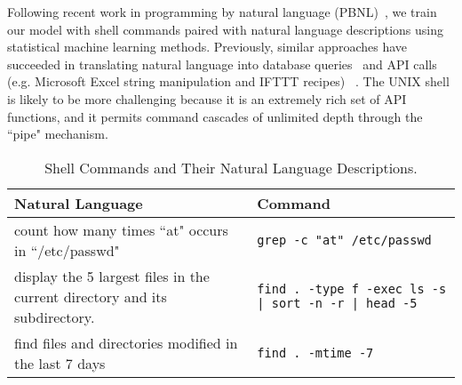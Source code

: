 Following recent work in programming by natural language (PBNL)~\cite{DBLP:conf/mobisys/LeGS13,DBLP:journals/corr/DesaiGHJKMRR15}, we train our model with shell commands paired with natural language descriptions using statistical machine learning methods. Previously, similar approaches have succeeded in translating natural language into database queries~\cite{DBLP:journals/pvldb/LiJ14} and API calls (e.g. Microsoft Excel string manipulation and IFTTT recipes) ~\cite{DBLP:conf/sigmod/GulwaniM14,DBLP:conf/acl/QuirkMG15}. The UNIX shell is likely to be more challenging because it is an extremely rich set of API functions, and it permits command cascades of unlimited depth through the ``pipe" mechanism.
\begin{center}
\begin{table}[t]
\begin{tabular}{p{1.5in}p{1.5in}}
    \textbf{Natural Language} & \textbf{Command} \\
    \hline \hline
    count how many times ``at" occurs in ``/etc/passwd" %
        &
        \texttt{grep -c "at" /etc/passwd} \\
    \hline
     display the 5 largest files in the current directory and its subdirectory. %
         &
         \texttt{find . -type f -exec ls -s {} \; | sort -n -r | head -5} \\
     \hline
     find files and directories modified in the last 7 days%
         &
         \texttt{find . -mtime -7} \\
\end{tabular}
\caption{Shell Commands and Their Natural Language Descriptions.}
\label{table:examples}
\end{table}
\end{center}

